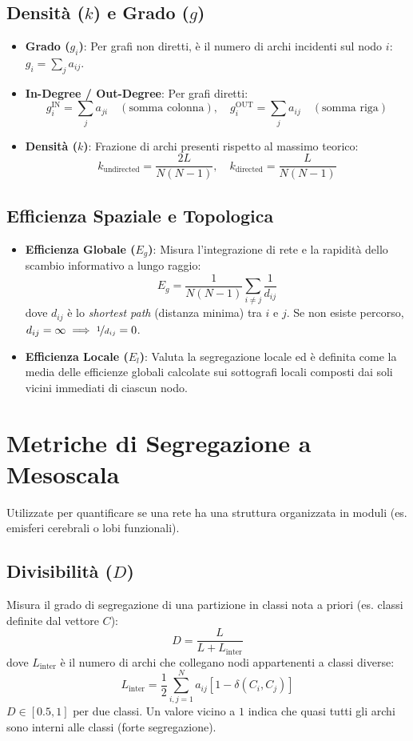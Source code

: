 \documentclass[10pt, letterpaper]{report}
\begin{document}
\subsection{Densità ($k$) e Grado ($g$)}
\begin{itemize}
    \item \textbf{Grado ($g_i$)}: Per grafi non diretti, è il numero di archi incidenti sul nodo $i$: $g_i = \sum_{j} a_{ij}$.
    \item \textbf{In-Degree / Out-Degree}: Per grafi diretti:
    \[
    g_i^{\text{IN}} = \sum_{j} a_{ji} \quad (\text{somma colonna}), \quad g_i^{\text{OUT}} = \sum_{j} a_{ij} \quad (\text{somma riga})
    \]
    \item \textbf{Densità ($k$)}: Frazione di archi presenti rispetto al massimo teorico:
    \[
    k_{\text{undirected}} = \frac{2L}{N(N-1)}, \quad k_{\text{directed}} = \frac{L}{N(N-1)}
    \]
\end{itemize}

\subsection{Efficienza Spaziale e Topologica}
\begin{itemize}
    \item \textbf{Efficienza Globale ($E_g$)}: Misura l'integrazione di rete e la rapidità dello scambio informativo a lungo raggio:
    \[
    E_g = \frac{1}{N(N-1)} \sum_{i \neq j} \frac{1}{d_{ij}}
    \]
    dove $d_{ij}$ è lo \emph{shortest path} (distanza minima) tra $i$ e $j$.
    Se non esiste percorso, $d_{ij} = \infty \implies \nicefrac{1}{d_{ij}} = 0$.
    \item \textbf{Efficienza Locale ($E_l$)}: Valuta la segregazione locale ed è definita come la media delle efficienze globali calcolate sui sottografi locali composti dai soli vicini immediati di ciascun nodo.
\end{itemize}

\section{Metriche di Segregazione a Mesoscala}
Utilizzate per quantificare se una rete ha una struttura organizzata in moduli (es. emisferi cerebrali o lobi funzionali).

\subsection{Divisibilità ($D$)}
Misura il grado di segregazione di una partizione in classi nota a priori (es. classi definite dal vettore $C$):
\[
D = \frac{L}{L + L_{\text{inter}}}
\]
dove $L_{\text{inter}}$ è il numero di archi che collegano nodi appartenenti a classi diverse:
\[
L_{\text{inter}} = \frac{1}{2} \sum_{i,j=1}^N a_{ij} [1 - \delta(C_i, C_j)]
\]
$D \in [0.5, 1]$ per due classi.
Un valore vicino a $1$ indica che quasi tutti gli archi sono interni alle classi (forte segregazione).
\end{document}
